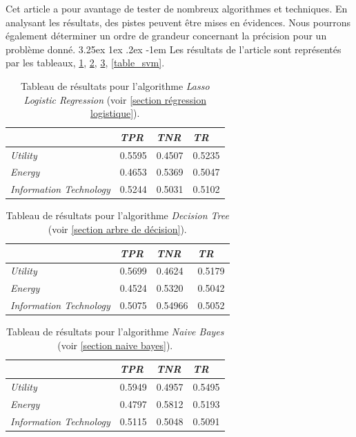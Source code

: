 \documentclass[a4paper, 11pt]{article}
\makeatletter
\newcounter{subsubsubsection}[subsubsection]
\renewcommand\paragraph{\@startsection{paragraph}{5}{\z@}%
  {3.25ex \@plus1ex \@minus.2ex}%
  {-1em}%
  {\normalfont\normalsize\bfseries}}
\makeatother
\begin{document}
Cet article a pour avantage de tester de nombreux algorithmes et techniques. En analysant les résultats, des pistes peuvent être mises en évidences. Nous pourrons également déterminer un ordre de grandeur concernant la précision pour un problème donné.
\paragraph{}
Les résultats de l'article \cite{machine_learning_automated_trading} sont représentés par les tableaux, \ref{table_lasso_logistic}, \ref{table_dt}, \ref{table_nb}, \ref{table_svm}.

\begin{table}[h!]
	\centering
\begin{tabular}{|l|l|l|l|}
	\hline
	\ & \textit{TPR} & \textit{TNR} & \textit{TR}\\
	\hline
	\textit{Utility} & 0.5595 & 0.4507 & 0.5235 \\
	\hline
	\textit{Energy} & 0.4653 & 0.5369 & 0.5047\\
	\hline
	\textit{Information Technology} & 0.5244 & 0.5031 & 0.5102\\
	\hline
\end{tabular}
\caption[]{Tableau de résultats pour l'algorithme \textit{Lasso Logistic Regression} (voir \ref{section régression logistique}).}
\label{table_lasso_logistic}
\end{table}



\begin{table}[h!]
	\centering
\begin{tabular}{|l|l|l|l|}
	\hline
	\ & \textit{TPR} & \textit{TNR} & \textit{TR}\\
	\hline
	\textit{Utility} & 0.5699 & 0.4624 & 0.5179 \\
	\hline
	\textit{Energy} & 0.4524 & 0.5320 & 0.5042\\
	\hline
	\textit{Information Technology} & 0.5075 & 0.54966 & 0.5052\\
	\hline
\end{tabular}
\caption[]{Tableau de résultats pour l'algorithme \textit{Decision Tree} (voir \ref{section arbre de décision}).}
\label{table_dt}
\end{table}



\begin{table}[h!]
	\centering
\begin{tabular}{|l|l|l|l|}
	\hline
	\ & \textit{TPR} & \textit{TNR} & \textit{TR}\\
	\hline
	\textit{Utility} & 0.5949 & 0.4957 & 0.5495 \\
	\hline
	\textit{Energy} & 0.4797 & 0.5812 & 0.5193\\
	\hline
	\textit{Information Technology} & 0.5115 & 0.5048 & 0.5091\\
	\hline
\end{tabular}
\caption[]{Tableau de résultats pour l'algorithme \textit{Naive Bayes} (voir \ref{section naive bayes}).}
\label{table_nb}
\end{table}
\end{document}
